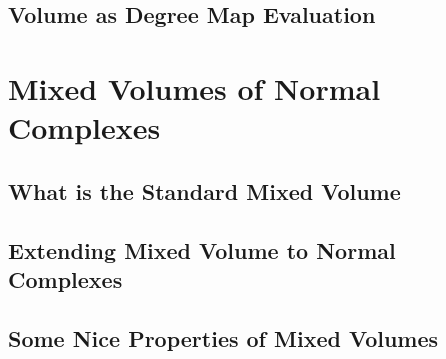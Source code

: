 \documentclass[12pt,oneside]{../../sfsuthesis}
\begin{document}
\subsection{Volume as Degree Map Evaluation}

\section{Mixed Volumes of Normal Complexes}

\subsection{What is the Standard Mixed Volume}

\subsection{Extending Mixed Volume to Normal Complexes}

\subsection{Some Nice Properties of Mixed Volumes}
\end{document}
